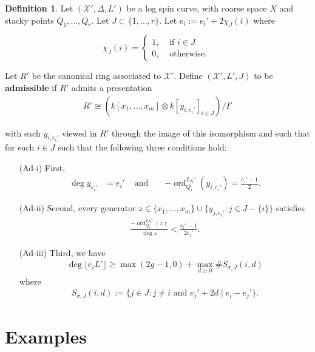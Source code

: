\documentclass{amsart}
\makeatletter
\theoremstyle{plain}
\theoremstyle{definition}
\newtheorem{defn}[thm]{Definition}
\theoremstyle{remark}
\numberwithin{equation}{section}
\DeclareMathOperator{\ord}{ord}
\newcommand\sx{\mathscr X}
\newcommand \subhalf[1]{\frac{{#1} - 1}{2{#1}}}
\newcommand{\halfcan}{L}
\newcommand{\customlabel}[2]{%
   \protected@write \@auxout {}{\string \newlabel {#1}{{#2}{\thepage}{#2}{#1}{}} }%
   \hypertarget{#1}{#2}
}
\makeatother
\begin{document}
\begin{defn}
\label{defn:admissible}
Let $(\sx', \Delta, L')$ be a log spin
curve, with coarse space $X$ and stacky points $Q_1, \ldots, Q_r$.  Let $J \subset
\{1, \ldots, r\}$. Let $e_i := e_i'+ 2 \chi_J (i)$ where

\[
\chi_J(i) = \begin{cases}
	1, &\text{ if }i \in J\\
	0, &\text{ otherwise. } 
\end{cases}
\]

Let $R'$ be the canonical ring associated to $\sx'$. Define $(\sx', \halfcan',J)$
to be {\bf admissible} if $R'$ admits a presentation
\begin{align*}
	R' \cong \left( k[x_1, \ldots, x_m] \otimes k[y_{i, e_i'}]_{i \in J} \right)/I'
\end{align*}

\noindent
with each $y_{i, e_i'}$ viewed in $R'$ through the image of this isomorphism and such that for each $i \in J$ such that the following
three conditions hold:
\begin{enumerate}
	\item[\customlabel{custom:Ad-i}{(Ad-i)}] First, 
		\begin{align*}
		\deg y_{e_i'} &= e_i'  &\text{ and } &&-\ord_{Q_i}^{\halfcan_X'}(y_{i, e_i'})
			= \frac{e_i'- 1}{2}.
		\end{align*}
	\item[\customlabel{custom:Ad-ii}{(Ad-ii)}] Second, every generator $z 
		\in \{x_1, \ldots, x_m\} \cup \{y_{j, e_i'}: j\in J - \{i\} \}$ 
		satisfies
		\begin{align*}
			\frac{-\ord_{Q_i}^{\halfcan_X'}(z)}{\deg z} < \subhalf {e_i'}.
		\end{align*}
	\item[\customlabel{custom:Ad-iii}{(Ad-iii)}] Third, we have
		\begin{align*}
			\deg \lfloor e_i L' \rfloor \geq \max(2g - 1,0) + \max_{d \geq 0} \# S_{\sigma, J}(i, d)
		\end{align*}
		where
		\begin{align*}
			S_{\sigma, J}(i, d) := \{j \in J : j \neq i \text{ and } e_j'+2d
			\mid e_i - e_j'\}.
		\end{align*}
\end{enumerate}
\end{defn}


\section{Examples}
\label{sec:examples}
\end{document}
